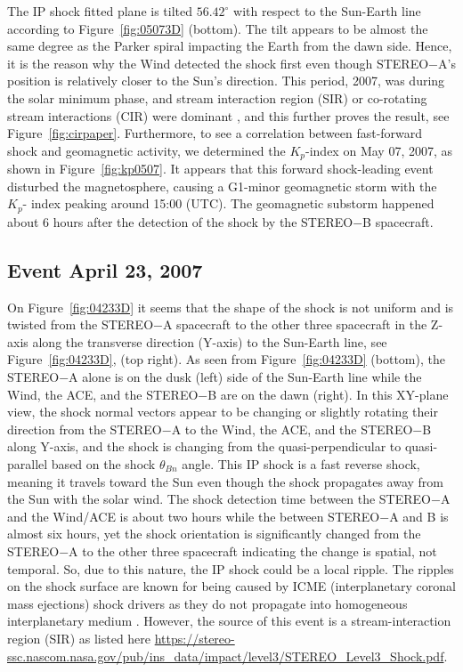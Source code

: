 \documentclass[draft]{agujournal2019}
\begin{document}
The IP shock fitted plane is tilted $56.42^{\circ}$ with respect to the Sun-Earth line according to Figure~\ref{fig:05073D} (bottom). The tilt appears to be almost the same degree as the Parker spiral impacting the Earth from the dawn side. Hence, it is the reason why the Wind detected the shock first even though STEREO$-$A's position is relatively closer to the Sun's direction. This period, 2007, was during the solar minimum phase, and stream interaction region (SIR) or co-rotating stream interactions (CIR) were dominant \cite{opitz14:_solar_stereo}, and this further proves the result, see Figure~\ref{fig:cirpaper}. Furthermore, to see a correlation between fast-forward shock and geomagnetic activity, we determined the $K_{p}$-index \cite[\url{https://www.swpc.noaa.gov/noaa-scales-explanation}]{bartels49:_index_ks_planet_kp_iatme_bull,rostoker72:_geomag,matzka21:_geomag_kp_index_deriv_indic_geomag_activ} on May 07, 2007, as shown in Figure~\ref{fig:kp0507}. It appears that this forward shock-leading event disturbed the magnetosphere, causing a G1-minor geomagnetic storm with the $K_{p}$- index peaking around 15:00 (UTC). The geomagnetic substorm happened about 6 hours after the detection of the shock by the STEREO$-$B spacecraft.    

\subsection{Event April 23, 2007}
\label{sec:disc20070423}

On Figure~\ref{fig:04233D} it seems that the shape of the shock is not uniform and is twisted from the STEREO$-$A spacecraft to the other three spacecraft in the Z-axis along the transverse direction (Y-axis) to the Sun-Earth line, see Figure~\ref{fig:04233D}, (top right). As seen from Figure~\ref{fig:04233D} (bottom), the STEREO$-$A alone is on the dusk (left) side of the Sun-Earth line while the Wind, the ACE, and the STEREO$-$B are on the dawn (right). In this XY-plane view, the shock normal vectors appear to be changing or slightly rotating their direction from the STEREO$-$A to the Wind, the ACE, and the STEREO$-$B along Y-axis, and the shock is changing from the quasi-perpendicular to quasi-parallel based on the shock $\theta_{Bn}$ angle. This IP shock is a fast reverse shock, meaning it travels toward the Sun even though the shock propagates away from the Sun with the solar wind. The shock detection time between the STEREO$-$A and the Wind/ACE is about two hours while the between STEREO$-$A and B is almost six hours, yet the shock orientation is significantly changed from the STEREO$-$A to the other three spacecraft indicating the change is spatial, not temporal. So, due to this nature, the IP shock could be a local ripple. The ripples on the shock surface are known for being caused by ICME (interplanetary coronal mass ejections) shock drivers as they do not propagate into homogeneous interplanetary medium \cite{acuna08:_stereo_impac_magnet_field_exper}. However, the source of this event is a stream-interaction region (SIR) as listed here \url{https://stereo-ssc.nascom.nasa.gov/pub/ins_data/impact/level3/STEREO_Level3_Shock.pdf}.
\end{document}
